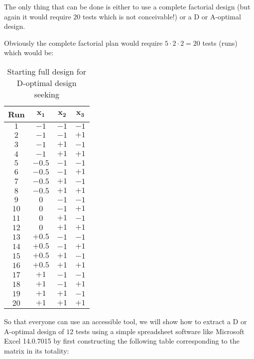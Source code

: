 	The only thing that can be done is either to use a complete factorial design (but again it would require $20$ tests which is not conceivable!) or a D or A-optimal design.

	Obviously the complete factorial plan would require $5\cdot 2\cdot 2=20$ tests (runs) which would be:
	\begin{table}[H]
	\begin{center}
			\begin{tabular}{|c|c|c|c|}
				\hline
				\cellcolor{black!30}\textbf{Run} & \cellcolor{black!30}\textbf{$\pmb{x_1}$} & \cellcolor{black!30}\textbf{$\pmb{x_2}$} & \cellcolor{black!30}\textbf{$\pmb{x_3}$}\\ \hline
				$1$ & $-1$ & $-1$ & $-1$ \\ \hline
				$2$ & $-1$ & $-1$ & $+1$ \\ \hline
				$3$ & $-1$ & $+1$ & $-1$ \\ \hline
				$4$ & $-1$ & $+1$ & $+1$ \\ \hline
				$5$ & $-0.5$ & $-1$ & $-1$ \\ \hline
				$6$ & $-0.5$ & $-1$ & $+1$ \\ \hline
				$7$ & $-0.5$ & $+1$ & $-1$ \\ \hline
				$8$ & $-0.5$ & $+1$ & $+1$ \\ \hline
				$9$ & $0$ & $-1$ & $-1$ \\ \hline
				$10$ & $0$ & $-1$ & $+1$ \\ \hline
				$11$ & $0$ & $+1$ & $-1$ \\ \hline
				$12$ & $0$ & $+1$ & $+1$ \\ \hline
				$13$ & $+0.5$ & $-1$ & $-1$ \\ \hline
				$14$ & $+0.5$ & $-1$ & $+1$ \\ \hline
				$15$ & $+0.5$ & $+1$ & $-1$ \\ \hline
				$16$ & $+0.5$ & $+1$ & $+1$ \\ \hline
				$17$ & $+1$ & $-1$ & $-1$ \\ \hline
				$18$ & $+1$ & $-1$ & $+1$ \\ \hline
				$19$ & $+1$ & $+1$ & $-1$ \\ \hline
				$20$ & $+1$ & $+1$ & $+1$ \\ \hline
		\end{tabular}
	\end{center}
	\caption{Starting full design for D-optimal design seeking}
	\end{table}
	So that everyone can use an accessible tool, we will show how to extract a D or A-optimal design of $12$ tests using a simple spreadsheet software like Microsoft Excel 14.0.7015 by first constructing the following table corresponding to the matrix in its totality:
